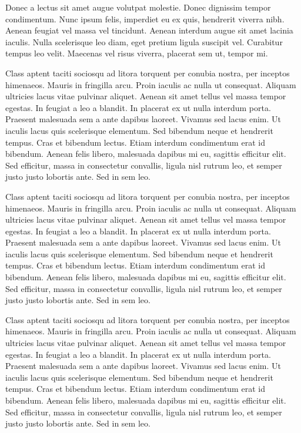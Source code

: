 \documentclass{article}
\begin{document}
\newpage

Donec a lectus sit amet augue volutpat molestie. Donec dignissim tempor condimentum. Nunc ipsum felis, imperdiet
eu ex quis, hendrerit viverra nibh. Aenean feugiat vel massa vel tincidunt. Aenean interdum augue sit amet lacinia
iaculis. Nulla scelerisque leo diam, eget pretium ligula suscipit vel. Curabitur tempus leo velit. Maecenas vel
risus viverra, placerat sem ut, tempor mi.

\vspace{5mm}
Class aptent taciti sociosqu ad litora torquent per conubia nostra, per inceptos himenaeos. Mauris in fringilla arcu. Proin iaculis ac nulla ut consequat. Aliquam ultricies lacus vitae pulvinar aliquet. Aenean sit amet tellus vel massa tempor egestas. In feugiat a leo a blandit. In placerat ex ut nulla interdum porta. Praesent malesuada sem a ante dapibus laoreet. Vivamus sed lacus enim. Ut iaculis lacus quis scelerisque elementum. Sed bibendum neque et hendrerit tempus. Cras et bibendum lectus. Etiam interdum condimentum erat id bibendum. Aenean felis libero, malesuada dapibus mi eu, sagittis efficitur elit. Sed efficitur, massa in consectetur convallis, ligula nisl rutrum leo, et semper justo justo lobortis ante. Sed in sem leo.

\vspace{5mm}
Class aptent taciti sociosqu ad litora torquent per conubia nostra, per inceptos himenaeos. Mauris in fringilla arcu. Proin iaculis ac nulla ut consequat. Aliquam ultricies lacus vitae pulvinar aliquet. Aenean sit amet tellus vel massa tempor egestas. In feugiat a leo a blandit. In placerat ex ut nulla interdum porta. Praesent malesuada sem a ante dapibus laoreet. Vivamus sed lacus enim. Ut iaculis lacus quis scelerisque elementum. Sed bibendum neque et hendrerit tempus. Cras et bibendum lectus. Etiam interdum condimentum erat id bibendum. Aenean felis libero, malesuada dapibus mi eu, sagittis efficitur elit. Sed efficitur, massa in consectetur convallis, ligula nisl rutrum leo, et semper justo justo lobortis ante. Sed in sem leo.

\vspace{5mm}
Class aptent taciti sociosqu ad litora torquent per conubia nostra, per inceptos himenaeos. Mauris in fringilla arcu. Proin iaculis ac nulla ut consequat. Aliquam ultricies lacus vitae pulvinar aliquet. Aenean sit amet tellus vel massa tempor egestas. In feugiat a leo a blandit. In placerat ex ut nulla interdum porta. Praesent malesuada sem a ante dapibus laoreet. Vivamus sed lacus enim. Ut iaculis lacus quis scelerisque elementum. Sed bibendum neque et hendrerit tempus. Cras et bibendum lectus. Etiam interdum condimentum erat id bibendum. Aenean felis libero, malesuada dapibus mi eu, sagittis efficitur elit. Sed efficitur, massa in consectetur convallis, ligula nisl rutrum leo, et semper justo justo lobortis ante. Sed in sem leo.
\end{document}

